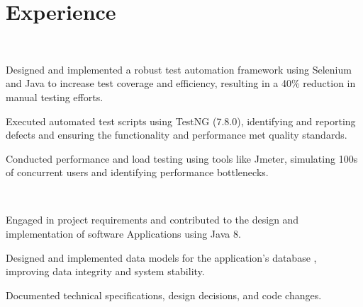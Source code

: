 \documentclass[]{deedy-resume-openfont}
\begin{document}
\begin{minipage}[t]{0.66\textwidth} 



\section{Experience}
 \\

\vspace{\topsep} %
\begin{tightemize}
\item Designed and implemented a robust test automation framework using Selenium and Java to increase test coverage and efficiency, resulting in a 40\% reduction in manual testing efforts. 
\item Executed automated test scripts using TestNG (7.8.0), identifying and reporting defects and ensuring the functionality and performance met quality standards.
\item Conducted performance and load testing using tools like Jmeter, simulating 100s of concurrent users and identifying performance bottlenecks.
\end{tightemize}

 \\

\begin{tightemize}
\item Engaged in project requirements and contributed to the design and implementation of software Applications using Java 8.
\item Designed and implemented data models for the application's database \newline [MySQL v.16], improving data integrity and system stability.
\item Documented technical specifications, design decisions, and code changes.
\end{tightemize}
\sectionsep



\end{minipage}
\end{document}
